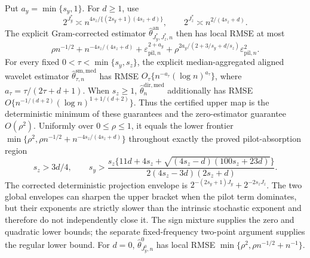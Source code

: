 Put \(a_y=\min\{s_y,1\}\). For \(d\ge1\), use
\[
2^{J_y^*}\asymp n^{4s_z/\{(2s_y+1)(4s_z+d)\}},
\qquad
2^{J_z^*}\asymp n^{2/(4s_z+d)}.
\]
The explicit Gram-corrected estimator \(\widehat\theta^{\mathrm{an}}_{J_y^*,J_z^*,n}\) then has local RMSE at most
\[
\rho n^{-1/2}+n^{-4s_z/(4s_z+d)}+\varepsilon_{\mathrm{pil},n}^{2+a_y}+\rho^{2a_y/(2+3/s_y+d/s_z)}\varepsilon_{\mathrm{pil},n}^2.
\]
For every fixed \(0<\tau<\min\{s_y,s_z\}\), the explicit median-aggregated aligned wavelet estimator \(\widehat\theta^{\mathrm{sm,med}}_{\tau,n}\) has RMSE \(O_\tau\{n^{-a_\tau}(\log n)^{a_\tau}\}\), where \(a_\tau=\tau/(2\tau+d+1)\). When \(s_z\ge1\), \(\widehat\theta_n^{\mathrm{dir,med}}\) additionally has RMSE \(O\{n^{-1/(d+2)}(\log n)^{1+1/(d+2)}\}\). Thus the certified upper map is the deterministic minimum of these guarantees and the zero-estimator guarantee \(O(\rho^2)\). Uniformly over \(0\le\rho\le1\), it equals the lower frontier \(\min\{\rho^2,\rho n^{-1/2}+n^{-4s_z/(4s_z+d)}\}\) throughout exactly the proved pilot-absorption region
\[
s_z>3d/4,
\qquad
s_y>\frac{s_z\{11d+4s_z+\sqrt{(4s_z-d)(100s_z+23d)}\}}{2(4s_z-3d)(2s_z+d)}.
\]
The corrected deterministic projection envelope is \(2^{-(2s_y+1)J_y}+2^{-2s_zJ_z}\). The two global envelopes can sharpen the upper bracket when the pilot term dominates, but their exponents are strictly slower than the intrinsic stochastic exponent and therefore do not independently close it. The sign mixture supplies the zero and quadratic lower bounds; the separate fixed-frequency two-point argument supplies the regular lower bound. For \(d=0\), \(\widehat\theta^0_{J_y^0,n}\) has local RMSE \(\min\{\rho^2,\rho n^{-1/2}+n^{-1}\}\).